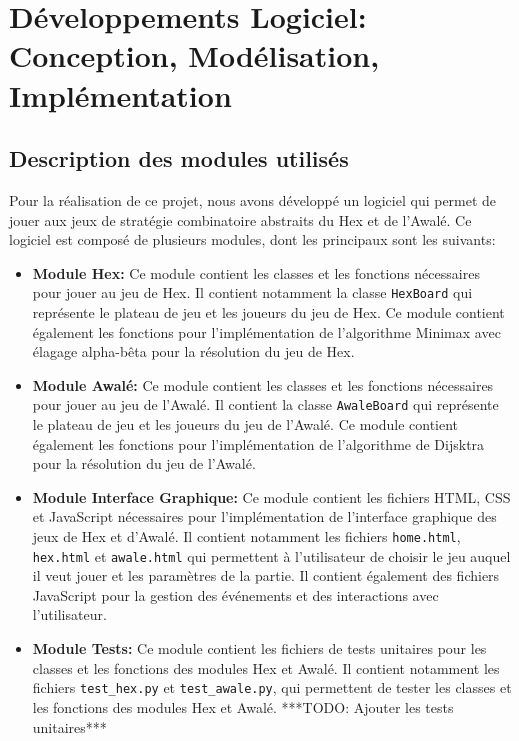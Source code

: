 \section{Développements Logiciel: Conception, Modélisation, Implémentation} 
\subsection{Description des modules utilisés}
Pour la réalisation de ce projet, nous avons développé un logiciel qui permet de jouer
aux jeux de stratégie combinatoire abstraits du Hex et de l'Awalé. Ce logiciel est
composé de plusieurs modules, dont les principaux sont les suivants:

\begin{itemize}
    \item \textbf{Module Hex:} Ce module contient les classes et les fonctions nécessaires
    pour jouer au jeu de Hex. Il contient notamment la classe \texttt{HexBoard} qui 
    représente le plateau de jeu et les joueurs du jeu de Hex. Ce module contient également 
    les fonctions pour l'implémentation de l'algorithme Minimax avec élagage alpha-bêta pour 
    la résolution du jeu de Hex.
    
    \item \textbf{Module Awalé:} Ce module contient les classes et les fonctions nécessaires
    pour jouer au jeu de l'Awalé. Il contient la classe \texttt{AwaleBoard} qui représente le
    plateau de jeu et les joueurs du jeu de l'Awalé. Ce module contient également les fonctions
    pour l'implémentation de l'algorithme de Dijsktra pour la résolution du jeu de l'Awalé.
    
    \item \textbf{Module Interface Graphique:} Ce module contient les fichiers HTML, CSS et
    JavaScript nécessaires pour l'implémentation de l'interface graphique des jeux de Hex et
    d'Awalé. Il contient notamment les fichiers \texttt{home.html}, \texttt{hex.html} et
    \texttt{awale.html} qui permettent à l'utilisateur de choisir le jeu auquel il veut jouer
    et les paramètres de la partie. Il contient également des fichiers JavaScript pour la
    gestion des événements et des interactions avec l'utilisateur.
    
    \item \textbf{Module Tests:} Ce module contient les fichiers de tests unitaires pour les
    classes et les fonctions des modules Hex et Awalé. Il contient notamment les fichiers
    \texttt{test\_hex.py} et \texttt{test\_awale.py}, qui permettent de tester les classes
    et les fonctions des modules Hex et Awalé. ***TODO: Ajouter les tests unitaires***
\end{itemize}


